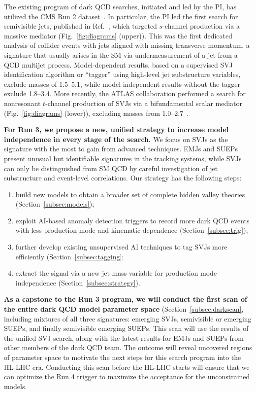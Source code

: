 The existing program of dark QCD searches, initiated and led by the PI, has utilized the CMS Run 2 dataset~\cite{Sirunyan:2018njd,CMS:2021dzg,CMS:2024nca,CMS:2024gxp}.
In particular, the PI led the first search for semivisible jets, published in Ref.~\cite{CMS:2021dzg}, which targeted $s$-channel production via a massive \PZprime mediator (Fig.~\ref{fig:diagrams} (upper)).
This was the first dedicated analysis of collider events with jets aligned with missing transverse momentum,
a signature that usually arises in the SM via undermeasurement of a jet from a QCD multijet process.
Model-dependent results, based on a supervised SVJ identification algorithm or ``tagger'' using high-level jet substructure variables, exclude \PZprime masses of 1.5--5.1\TeV,
while model-independent results without the tagger exclude 1.8--3.4\TeV.
More recently, the ATLAS collaboration performed a search for nonresonant $t$-channel production of SVJs via a bifundamental scalar mediator \Pbifun  (Fig.~\ref{fig:diagrams} (lower)),
excluding masses from 1.0--2.7\TeV~\cite{ATLAS:2023swa}.

\textbf{For Run 3, we propose a new, unified strategy to increase model independence in every stage of the search.}
We focus on SVJs as the signature with the most to gain from advanced techniques.
EMJs and SUEPs present unusual but identifiable signatures in the tracking systems,
while SVJs can only be distinguished from SM QCD by careful investigation of jet substructure and event-level correlations.
Our strategy has the following steps:
\begin{enumerate}
\item build new models to obtain a broader set of complete hidden valley theories (Section~\ref{subsec:models});
\item exploit AI-based anomaly detection triggers to record more dark QCD events with less production mode and kinematic dependence (Section~\ref{subsec:trig});
\item further develop existing unsupervised AI techniques to tag SVJs more efficiently (Section~\ref{subsec:tagging};
\item extract the signal via a new jet mass variable for production mode independence (Section~\ref{subsec:strategy}).
\end{enumerate}

\textbf{As a capstone to the Run 3 program, we will conduct the first scan of the entire dark QCD model parameter space} (Section~\ref{subsec:darkscan},
including mixtures of all three signatures: emerging SVJs, semivisible or emerging SUEPs, and finally semivisible emerging SUEPs.
This scan will use the results of the unified SVJ search, along with the latest results for EMJs and SUEPs from other members of the dark QCD team.
The outcome will reveal uncovered regions of parameter space to motivate the next steps for this search program into the HL-LHC era.
Conducting this scan before the HL-LHC starts will ensure that we can optimize the Run 4 trigger to maximize the acceptance for the unconstrained models.

